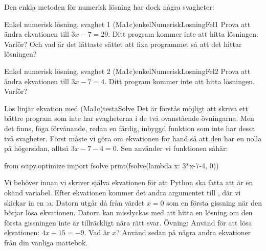 Den enkla metoden för numerisk lösning har dock några svagheter:

\begin{matteovning}{Enkel numerisk lösning, svaghet 1 (Ma1c)}{enkelNumeriskLosningFel1}
Prova att ändra ekvationen till $3x-7=29$. Ditt program kommer inte att hitta lösningen. Varför? Och vad är det lättaste sättet att fixa programmet så att det hittar lösningen?
\end{matteovning}

\begin{matteovning}{Enkel numerisk lösning, svaghet 2 (Ma1c)}{enkelNumeriskLosningFel2}
Prova att ändra ekvationen till $3x-7=4$. Ditt program kommer inte att hitta lösningen. Varför?
\end{matteovning}


\begin{matteovning}{Lös linjär ekvation med  (Ma1c)}{testaSolve}
Det är förstås möjligt att skriva ett bättre program som inte har svagheterna i de två ovanstående övningarna. Men det finns, föga förvånande, redan en färdig, inbyggd funktion som inte har dessa två svagheter. Först måste vi göra om ekvationen för hand så att den har en nolla på högersidan, alltså $3x-7-4=0$. Sen använder vi funktionen  såhär:

\vspace{10pt}
\begin{python}
from scipy.optimize import fsolve
print(fsolve(lambda x: 3*x-7-4, 0))
\end{python}

Vi behöver  innan vi skriver själva ekvationen för att Python ska fatta att  är en okänd variabel. Efter ekvationen kommer det andra argumentet till , där vi skickar in en :a. Datorn utgår då från värdet $x=0$ som en första gissning när den börjar lösa ekvationen. Datorn kan misslyckas med att hitta en lösning om den första gissningen inte är tillräckligt nära rätt svar.
\newline
\newline
Övning: Använd  för att lösa ekvationen: $4x+15=-9$. Vad är $x$?
\newline
\newline
Använd sedan  på några andra ekvationer från din vanliga mattebok.
\end{matteovning}

